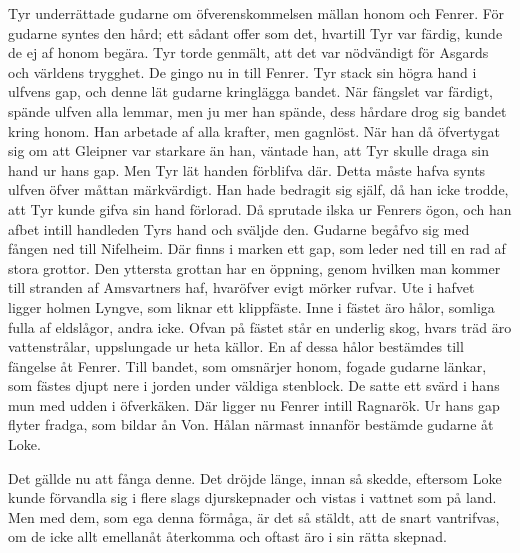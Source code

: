 Tyr underrättade gudarne om öfverenskommelsen mällan honom och Fenrer.
För gudarne syntes den hård; ett sådant offer som det, hvartill Tyr var
färdig, kunde de ej af honom begära. Tyr torde genmält, att det var
nödvändigt för Asgards och världens trygghet. De gingo nu in till
Fenrer. Tyr stack sin högra hand i ulfvens gap, och denne lät gudarne
kringlägga bandet. När fängslet var färdigt, spände ulfven alla lemmar,
men ju mer han spände, dess hårdare drog sig bandet kring honom. Han
arbetade af alla krafter, men gagnlöst. När han då öfvertygat sig om att
Gleipner var starkare än han, väntade han, att Tyr skulle draga sin hand
ur hans gap. Men Tyr lät handen förblifva där. Detta måste hafva synts
ulfven öfver måttan märkvärdigt. Han hade bedragit sig själf, då han
icke trodde, att Tyr kunde gifva sin hand förlorad. Då sprutade ilska ur
Fenrers ögon, och han afbet intill handleden Tyrs hand och sväljde den.
Gudarne begåfvo sig med fången ned till Nifelheim. Där finns i marken
ett gap, som leder ned till en rad af stora grottor. Den yttersta
grottan har en öppning, genom hvilken man kommer till stranden af
Amsvartners haf, hvaröfver evigt mörker rufvar. Ute i hafvet ligger
holmen Lyngve, som liknar ett klippfäste. Inne i fästet äro hålor,
somliga fulla af eldslågor, andra icke. Ofvan på fästet står en underlig
skog, hvars träd äro vattenstrålar, uppslungade ur heta källor. En af
dessa hålor bestämdes till fängelse åt Fenrer. Till bandet, som
omsnärjer honom, fogade gudarne länkar, som fästes djupt nere i jorden
under väldiga stenblock. De satte ett svärd i hans mun med udden i
öfverkäken. Där ligger nu Fenrer intill Ragnarök. Ur hans gap flyter
fradga, som bildar ån Von. Hålan närmast innanför bestämde gudarne åt
Loke.

Det gällde nu att fånga denne. Det dröjde länge, innan
\protect\hypertarget{lb1625905.xhtmlux5cux23start172}{}{}\protect\hypertarget{lb1625905.xhtmlux5cux23start172-a}{}{}\protect\hypertarget{lb1625905.xhtmlux5cux23start172-b}{}{}\protect\hypertarget{lb1625905.xhtmlux5cux23start172-c}{}{}\protect\hypertarget{lb1625905.xhtmlux5cux23start172-d}{}{}
så skedde, eftersom Loke kunde förvandla sig i flere slags djurskepnader
och vistas i vattnet som på land. Men med dem, som ega denna förmåga, är
det så stäldt, att de snart vantrifvas, om de icke allt emellanåt
återkomma och oftast äro i sin rätta skepnad.


